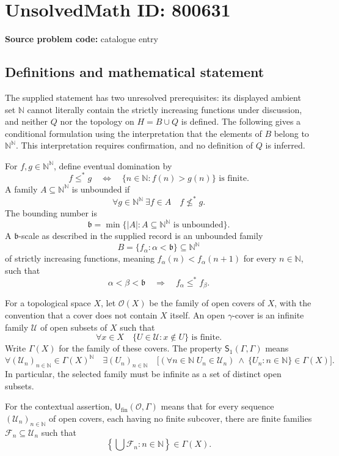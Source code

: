 \documentclass[11pt]{article}
\begin{document}
\section*{UnsolvedMath ID: 800631}
\textbf{Source problem code:} catalogue entry
\subsection{Definitions and mathematical statement}
The supplied statement has two unresolved prerequisites: its displayed ambient set \(\mathbb N\) cannot literally contain the strictly increasing functions under discussion, and neither \(Q\) nor the topology on \(H=B\cup Q\) is defined. The following gives a conditional formulation using the interpretation that the elements of \(B\) belong to \(\mathbb N^{\mathbb N}\). This interpretation requires confirmation, and no definition of \(Q\) is inferred.

For \(f,g\in\mathbb N^{\mathbb N}\), define eventual domination by
\[
 f\leq^*g\quad\Longleftrightarrow\quad
 \{n\in\mathbb N:f(n)>g(n)\}\text{ is finite}.
\]
A family \(A\subseteq\mathbb N^{\mathbb N}\) is unbounded if
\[
 \forall g\in\mathbb N^{\mathbb N}\ \exists f\in A\quad f\not\leq^*g.
\]
The bounding number is
\[
 \mathfrak b=\min\{|A|:A\subseteq\mathbb N^{\mathbb N}\text{ is unbounded}\}.
\]
A \(\mathfrak b\)-scale as described in the supplied record is an unbounded family
\[
 B=\{f_\alpha:\alpha<\mathfrak b\}\subseteq\mathbb N^{\mathbb N}
\]
of strictly increasing functions, meaning \(f_\alpha(n)<f_\alpha(n+1)\) for every \(n\in\mathbb N\), such that
\[
 \alpha<\beta<\mathfrak b\quad\Longrightarrow\quad f_\alpha\leq^*f_\beta.
\]

For a topological space \(X\), let \(\mathcal O(X)\) be the family of open covers of \(X\), with the convention that a cover does not contain \(X\) itself. An open \(\gamma\)-cover is an infinite family \(\mathcal U\) of open subsets of \(X\) such that
\[
 \forall x\in X\quad\{U\in\mathcal U:x\notin U\}\text{ is finite}.
\]
Write \(\Gamma(X)\) for the family of these covers. The property \(\mathsf S_1(\Gamma,\Gamma)\) means
\[
 \forall (\mathcal U_n)_{n\in\mathbb N}\in\Gamma(X)^{\mathbb N}\quad
 \exists (U_n)_{n\in\mathbb N}\quad
 \bigl[(\forall n\in\mathbb N\; U_n\in\mathcal U_n)
 \ \land\ \{U_n:n\in\mathbb N\}\in\Gamma(X)\bigr].
\]
In particular, the selected family must be infinite as a set of distinct open subsets.

For the contextual assertion, \(\mathsf U_{\mathrm{fin}}(\mathcal O,\Gamma)\) means that for every sequence \((\mathcal U_n)_{n\in\mathbb N}\) of open covers, each having no finite subcover, there are finite families \(\mathcal F_n\subseteq\mathcal U_n\) such that
\[
 \left\{\bigcup\mathcal F_n:n\in\mathbb N\right\}\in\Gamma(X).
\]
\end{document}
